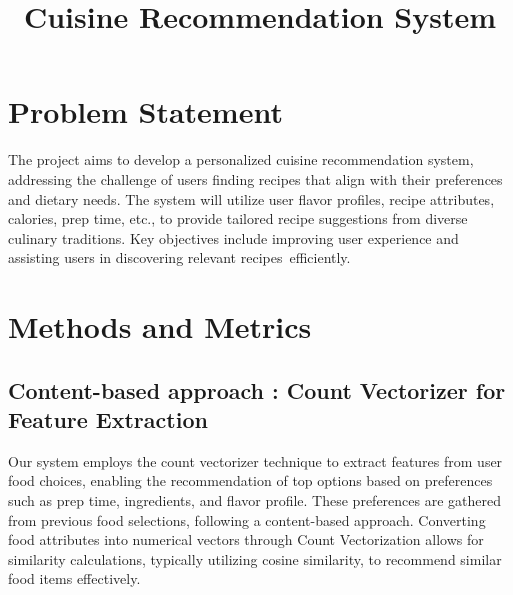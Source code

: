 \documentclass[conference]{IEEEtran}
\begin{document}
\title{Cuisine Recommendation System}

\author{
\and
{}
}

\maketitle

\section{Problem Statement}
The project aims to develop a personalized cuisine recommendation system, addressing the challenge of users finding recipes that align with their preferences and dietary needs. The system will utilize user flavor profiles, recipe attributes, calories, prep time, etc., to provide tailored recipe suggestions from diverse culinary traditions. Key objectives include improving user experience and assisting users in discovering relevant recipes efficiently.
\\
\section{Methods and Metrics}
\subsection{Content-based approach : Count Vectorizer for Feature Extraction}

Our system employs the count vectorizer technique to extract features from user food choices, enabling the recommendation of top options based on preferences such as prep time, ingredients, and flavor profile. These preferences are gathered from previous food selections, following a content-based approach. Converting food attributes into numerical vectors through Count Vectorization allows for similarity calculations, typically utilizing cosine similarity, to recommend similar food items effectively.
\\
\end{document}
